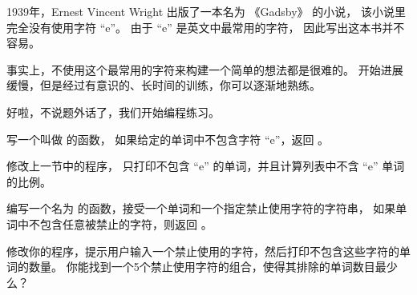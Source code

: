 \begin{exercise}


1939年，Ernest Vincent Wright 出版了一本名为 《Gadsby》 的小说，
该小说里完全没有使用字符 ``e''。 由于 ``e'' 是英文中最常用的字符， 因此写出这本书并不容易。


事实上，不使用这个最常用的字符来构建一个简单的想法都是很难的。
开始进展缓慢，但是经过有意识的、长时间的训练，你可以逐渐地熟练。


好啦，不说题外话了，我们开始编程练习。


写一个叫做  的函数， 如果给定的单词中不包含字符 ``e''，返回  。


修改上一节中的程序， 只打印不包含 ``e'' 的单词，并且计算列表中不含 ``e'' 单词的比例。

\end{exercise}


\begin{exercise}


编写一个名为  的函数，接受一个单词和一个指定禁止使用字符的字符串，
如果单词中不包含任意被禁止的字符，则返回  。


修改你的程序，提示用户输入一个禁止使用的字符，然后打印不包含这些字符的单词的数量。
你能找到一个5个禁止使用字符的组合，使得其排除的单词数目最少么？

\end{exercise}



